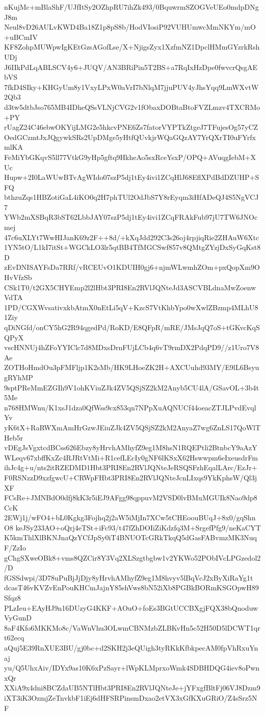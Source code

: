 nKujMc+mBlaShF/UJfItSy2OZhpRU7ihZk493/0BquwrmSZOGVeUEo0mdpDNgJ8m
Neul8vD26AULvKWD4Ba18Z1p8pS8b/HodVIosiP92VUHUmwcMmNKYm/mO+uBCmIV
KF8ZohpMUWpwIgKEtGzsAGofLse/X+NjigsZyx1XzfmNZ1DpclHMmGYzrkRshUDj
J6IIkPdLqABLSCV4y6+JUQV/AN3BRiPin5T2BS+a7RqIxHzDpe0fwvcrQsgAEbVS
7fkD4SIky+KHGyUm8y1VxyLPxW0aVrI7bNlqM7jjuPUV4yJhsYqq9LmWXvtW2Qb3
d3tw5dtbJso765MB4IDheQSsVLNjCVG2v1fObaxDOBtaBtoFVZLmzv4TXCRMo+PY
rUagZ24C46ebwOKYijLMG2e5hkcvPNE6Zs7fatorVYPTkZtgeJ7TFujesOg57yCZ
OedGCzmtJxJQgywkSRs2UpDMge5yHtfQUvkjrWQaGQzAY7YrQXrTI0uFYrfxmlKA
FeMiYbGKqvS5ll77VtkG9yHp5gftq9HkheAo5sxRceYsxP/OPQ+AVuqgIebM+XUc
Hupw+2I0LaWUwBTvAgWIdo07szP5dj1tEy4ivi1ZCqHlJ68EflXPdBdDZUHP+SFQ
bthzuZqs1HBZotiGaL4iKO0q2H7phTUl2OdJbS7Y8rEyqm3iHfADeQJ4S5NgVCJ7
YWb2mXSBqR3bST62LbbJAY07szP5dj1tEy4ivi1ZCqFRAkFub97jU7TW6JNOcmej
47c6uXLYt7WwHIJanK69z2F++8d/+kXqJdd292C3s26oj4rpjiqRie2ZHAuW6Xtc
1YN5tO/L1kI7itSt+WGCkLO3lr5qtBB4TfMGCSwf857v8QMtgZYzjDxSyGqKst8D
zEvDNISAYFsDa7RRf/vRCEUvO1KDUIH0gj6+njmWLwmhZOm+pxQopXm9OHvVfzSb
CSk1T0/t2GX5CHYEmp2l2lHbt3PRI8En2RVlJQNteJd3ASCVBLdnaMwZoenwVdTA
1PD/CGXWvsativxkbAtmX0nEtLi5qV+KzcS7VtKhbYpo0wXwlZBzmp4MLhU81Ziy
qDiNGfd/onCY5hG2R94qgedPd/RoKD/E8QFpR/mRE/JMsJqQ7oS+tGKvcKqSQPyX
vscHNNUj4hZFoYYIClc7d8MDxsDrnFUjLCb4q6vT9rmDX2PdqPD9//z1Uro7V8Ae
ZOTHoHmdOu3pFMFljp1K2sMb/HK9LHoeZK2H+AXCUuhd93MY/E9lL6BsyugRYhMP
9sptPReMmEZGIh9V1ohKViuZJk4ZV5QSjSZ2kM2Anyb5CU4lA/GSavOL+3b4t5Me
n768HMWnu/K1xsJ1dza0QfWss9cx853qn7NPpXuAQNUCf44oeacZTJLPvdEvqlYv
yK6tX+RaRWXmAmHrGzwJEiuZJk4ZV5QSjSZ2kM2AnyaZ7wg6ZnLS17QoWlTHeb5r
vDEgJsVgxtcdBCss626Ebzy8yHrvhAMhyfZ9eg1M8hsN1RQEPtli2BtnbcY9aAzY
WLeqv67xbffKxZc4RJRtVtMi+R1cefLEcIy0gNF6lKSxX62Hswwpm6eIxeusdrFm
ihJc4g+u/nts2itRZEDMD1Hbt3PRI8En2RVlJQNteJeRSQSFzhEqalLArc/EzJr+
F0RSNzzD9xzfgwcU+CRWpFHbt3PRI8En2RVlJQNteJcnLIxqs9YkKphsW/Ql3jXF
FCsRe+JMNBdO0dfj8kK3r5iEJ9AFgg98qppuvM2VSD0lvBMuMGUIk8Nao9dp8CcK
2EWj1j/wFO4+bL0Kgkg3Fojhq2j2aW5iMjIn7XCw5tCHEoouBUqJ+8x0/gqShnO8
keJSy233AO+oQrj4eTSt+iFc93/t47fZhDOIiZiKdzfq3M+SrgefPfg9/neKaCYT
K5kmThlXlBKNJnaQzYCfJpSy0iT4BNUOTcGRkTkqQ5dGasFABvmzMK3NuqF/ZzIo
gChgSXweOBk8+vms8QZCir8Y3Vq2XLSzgtbgbw1v2YKWo52PObIVcLPGzedol2/D
fGSSdwpi/3D78uPuBjJjDjy8yHrvhAMhyfZ9eg1M8hvyv5lBqVcJ2xByXiRaYg1t
dcasT46vKVZvEnPouKHCmJajnY85shVws8bN52iXb8PGBkBORmKSGOpwH89Sfqz8
PLzIeu+EAyHJ9n16DUzyG4KKF+AOuO+foEs3BGtUCCBXgjFQX38bQnoduwVyGunD
8aF4Kfo6MKKMo8c/VaWnVhu3OLwmCBNMzbZLBKvHn5c52H50D5lDCWT1qrt62ecq
aQuj5E39RnXUE3BU/gj0bc+d2SKH2j3eQUigh3tyRKkKfbkpecAM0fpVhRxuYnaj
yu/Q5UhxAiv/IDYx9as10K6xPzSayr+lWpKLMprxoWmk4SDBHDQG4iev8oPwnxQr
XXiA9x4dni8BCZdaUB5NTlHbt3PRI8En2RVlJQNteJe+jYFxgfBltFj06VJ8Dzm9
iXT3iK3OzmjZeTnvkbF1iEj6dHFSRPinsmDxao2etVX3xGfKXuGRiO/Z4sSrz5NF
